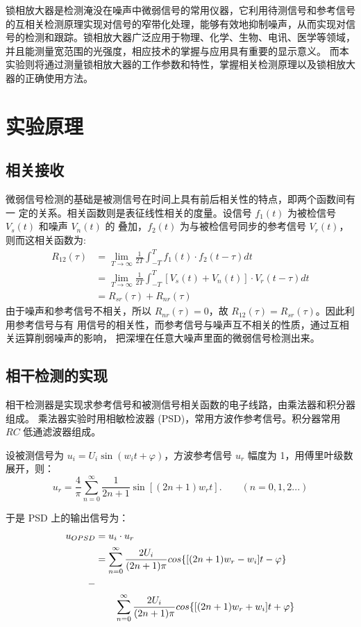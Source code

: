 \documentclass{whureport}
\begin{document}
\begin{multicols}{2}
	锁相放大器是检测淹没在噪声中微弱信号的常用仪器，它利用待测信号和参考信号的互相关检测原理实现对信号的窄带化处理，能够有效地抑制噪声，从而实现对信号的检测和跟踪。锁相放大器广泛应用于物理、化学、生物、电讯、医学等领域，并且能测量宽范围的光强度，相应技术的掌握与应用具有重要的显示意义。 而本实验则将通过测量锁相放大器的工作参数和特性，掌握相关检测原理以及锁相放大器的正确使用方法。

	\section{实验原理}
	\subsection{相关接收}
	微弱信号检测的基础是被测信号在时间上具有前后相关性的特点，即两个函数间有一
定的关系。相关函数则是表征线性相关的度量。设信号 $f_1(t)$ 为被检信号 $V_s(t)$ 和噪声 $V_n(t)$ 的
叠加，$f_2(t)$ 为与被检信号同步的参考信号 $V_r(t)$，则而这相关函数为: 
\begin{align*}
    R_{12}(\tau) &= \lim_{T \to \infty} \frac{1}{2T} \int_{-T}^{T} f_1(t) \cdot f_2(t - \tau) dt \\
                  &= \lim_{T \to \infty} \frac{1}{2T} \int_{-T}^{T} [V_s(t) + V_n(t)] \cdot V_r(t - \tau) dt  \tag{1} \\
                  &= R_{sr}(\tau) + R_{nr}(\tau)
\end{align*}
由于噪声和参考信号不相关，所以 $R_{nr}(\tau) = 0$，故 $R_{12}(\tau) = R_{sr}(\tau)$。因此利用参考信号与有
用信号的相关性，而参考信号与噪声互不相关的性质，通过互相关运算削弱噪声的影响，
把深埋在任意大噪声里面的微弱信号检测出来。
\subsection{相干检测的实现}
相干检测器是实现求参考信号和被测信号相关函数的电子线路，由乘法器和积分器组成。
乘法器实验时用相敏检波器 (PSD)，常用方波作参考信号。积分器常用 $RC$ 低通滤波器组成。

设被测信号为 $u_i = U_i \sin{(w_i t + \varphi)}$，方波参考信号 $u_r$ 幅度为 1，用傅里叶级数展开，则：
\begin{equation}
    u_r = \frac{4}{\pi} \sum_{n=0}^{\infty} \frac{1}{2n+1} \sin{[(2n + 1)w_r t]}. \qquad (n = 0, 1, 2 ...)
\end{equation}

于是 PSD 上的输出信号为：
\begin{align}
    u_{OPSD} &= u_i \cdot u_r \\
             &= \sum_{n=0}^{\infty} \frac{2 U_i}{(2n+1)\pi} cos\{[(2n + 1)w_r - w_i]t - \varphi \} \\- \notag \\
             & \qquad \sum_{n=0}^{\infty} \frac{2 U_i}{(2n+1)\pi} cos\{[(2n + 1)w_r + w_i]t + \varphi \}
\end{align}


\end{multicols}
\end{document}
